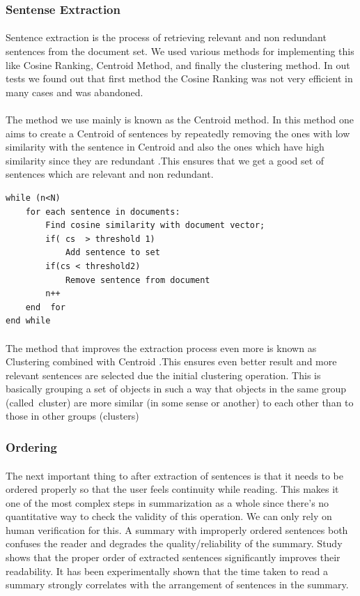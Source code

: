\subsubsection{Sentense Extraction}
\paragraph{} Sentence extraction is the process of retrieving relevant and non redundant sentences from the document set. We used various methods for implementing this like Cosine Ranking, Centroid Method, and finally the clustering method. In out tests we found out that first method the Cosine Ranking was not very efficient in many cases and was abandoned.
\paragraph{}	The method we use mainly is known as the Centroid method. In this method one aims to create a Centroid of sentences by repeatedly removing the ones with low similarity with the sentence in Centroid and also the ones which have high similarity since they are redundant .This ensures that we get a good set of sentences which are relevant and non redundant.
\begin{lstlisting}
while (n<N)
	for each sentence in documents:
		Find cosine similarity with document vector;
		if( cs  > threshold 1)
			Add sentence to set
		if(cs < threshold2)
			Remove sentence from document 
		n++
	end  for
end while
\end{lstlisting}
\paragraph{} The method that improves the extraction process even more is known as Clustering combined with Centroid .This ensures even better result and more relevant sentences are selected due the initial clustering operation. This is basically grouping a set of objects in such a way that objects in the same group (called cluster) are more similar (in some sense or another) to each other than to those in other groups (clusters)
\subsubsection{Ordering}
\paragraph{} The next important thing to after extraction of sentences is that it needs to be ordered properly so that the user feels continuity while reading. This makes it one of the most complex steps in summarization as a whole since there’s no quantitative way to check the validity of this operation. We can only rely on human verification for this. A summary with improperly ordered sentences both confuses the reader and degrades the quality/reliability of the summary. Study shows that the proper order of extracted sentences significantly improves their readability. It has been experimentally shown that the time taken to read a summary strongly correlates with the arrangement of sentences in the summary.
